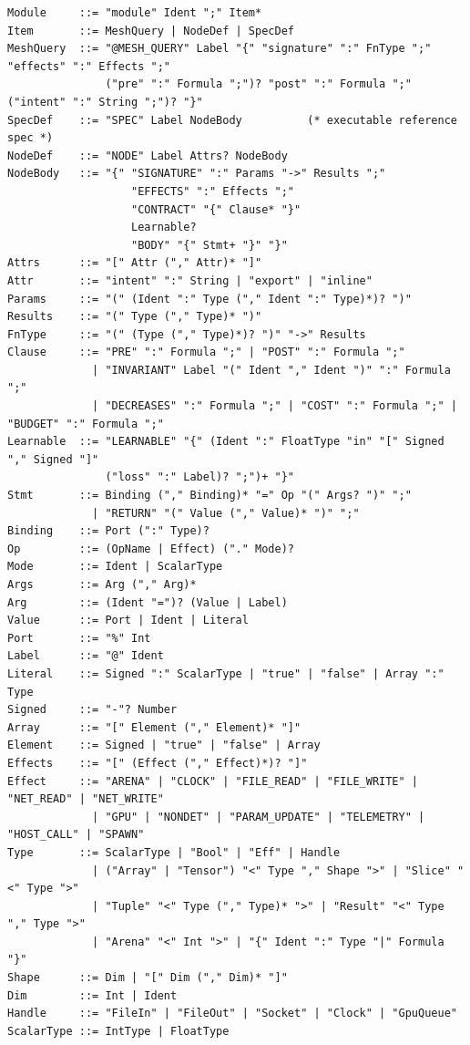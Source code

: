\begin{lstlisting}[language={},basicstyle=\ttfamily\scriptsize,frame=lines]
Module     ::= "module" Ident ";" Item*
Item       ::= MeshQuery | NodeDef | SpecDef
MeshQuery  ::= "@MESH_QUERY" Label "{" "signature" ":" FnType ";" "effects" ":" Effects ";"
               ("pre" ":" Formula ";")? "post" ":" Formula ";" ("intent" ":" String ";")? "}"
SpecDef    ::= "SPEC" Label NodeBody          (* executable reference spec *)
NodeDef    ::= "NODE" Label Attrs? NodeBody
NodeBody   ::= "{" "SIGNATURE" ":" Params "->" Results ";"
                   "EFFECTS" ":" Effects ";"
                   "CONTRACT" "{" Clause* "}"
                   Learnable?
                   "BODY" "{" Stmt+ "}" "}"
Attrs      ::= "[" Attr ("," Attr)* "]"
Attr       ::= "intent" ":" String | "export" | "inline"
Params     ::= "(" (Ident ":" Type ("," Ident ":" Type)*)? ")"
Results    ::= "(" Type ("," Type)* ")"
FnType     ::= "(" (Type ("," Type)*)? ")" "->" Results
Clause     ::= "PRE" ":" Formula ";" | "POST" ":" Formula ";"
             | "INVARIANT" Label "(" Ident "," Ident ")" ":" Formula ";"
             | "DECREASES" ":" Formula ";" | "COST" ":" Formula ";" | "BUDGET" ":" Formula ";"
Learnable  ::= "LEARNABLE" "{" (Ident ":" FloatType "in" "[" Signed "," Signed "]"
               ("loss" ":" Label)? ";")+ "}"
Stmt       ::= Binding ("," Binding)* "=" Op "(" Args? ")" ";"
             | "RETURN" "(" Value ("," Value)* ")" ";"
Binding    ::= Port (":" Type)?
Op         ::= (OpName | Effect) ("." Mode)?
Mode       ::= Ident | ScalarType
Args       ::= Arg ("," Arg)*
Arg        ::= (Ident "=")? (Value | Label)
Value      ::= Port | Ident | Literal
Port       ::= "%" Int
Label      ::= "@" Ident
Literal    ::= Signed ":" ScalarType | "true" | "false" | Array ":" Type
Signed     ::= "-"? Number
Array      ::= "[" Element ("," Element)* "]"
Element    ::= Signed | "true" | "false" | Array
Effects    ::= "[" (Effect ("," Effect)*)? "]"
Effect     ::= "ARENA" | "CLOCK" | "FILE_READ" | "FILE_WRITE" | "NET_READ" | "NET_WRITE"
             | "GPU" | "NONDET" | "PARAM_UPDATE" | "TELEMETRY" | "HOST_CALL" | "SPAWN"
Type       ::= ScalarType | "Bool" | "Eff" | Handle
             | ("Array" | "Tensor") "<" Type "," Shape ">" | "Slice" "<" Type ">"
             | "Tuple" "<" Type ("," Type)* ">" | "Result" "<" Type "," Type ">"
             | "Arena" "<" Int ">" | "{" Ident ":" Type "|" Formula "}"
Shape      ::= Dim | "[" Dim ("," Dim)* "]"
Dim        ::= Int | Ident
Handle     ::= "FileIn" | "FileOut" | "Socket" | "Clock" | "GpuQueue"
ScalarType ::= IntType | FloatType

\end{lstlisting}
